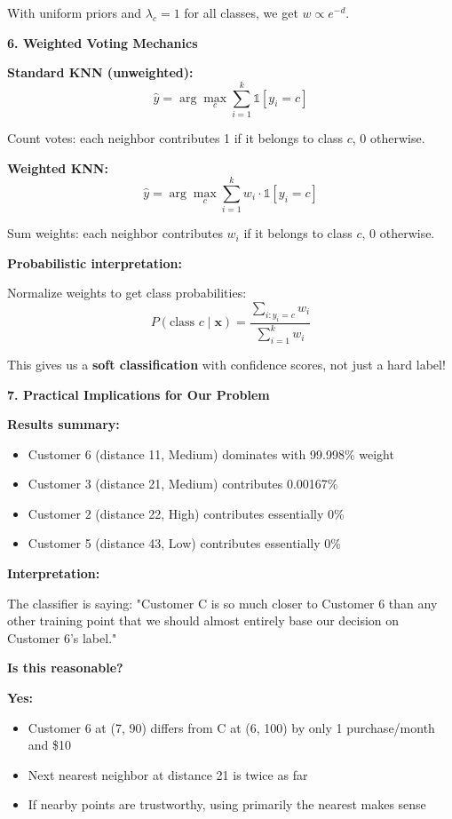\documentclass[12pt]{article}
\begin{document}
\begin{explanation}
With uniform priors and \(\lambda_c = 1\) for all classes, we get \(w \propto e^{-d}\).

\textbf{6. Weighted Voting Mechanics}

\textbf{Standard KNN (unweighted):}
\[
\hat{y} = \arg\max_{c} \sum_{i=1}^k \mathbb{1}[y_i = c]
\]

Count votes: each neighbor contributes 1 if it belongs to class \(c\), 0 otherwise.

\textbf{Weighted KNN:}
\[
\hat{y} = \arg\max_{c} \sum_{i=1}^k w_i \cdot \mathbb{1}[y_i = c]
\]

Sum weights: each neighbor contributes \(w_i\) if it belongs to class \(c\), 0 otherwise.

\textbf{Probabilistic interpretation:}

Normalize weights to get class probabilities:
\[
P(\text{class } c \mid \mathbf{x}) = \frac{\sum_{i: y_i = c} w_i}{\sum_{i=1}^k w_i}
\]

This gives us a \textbf{soft classification} with confidence scores, not just a hard label!

\textbf{7. Practical Implications for Our Problem}

\textbf{Results summary:}
\begin{itemize}
    \item Customer 6 (distance 11, Medium) dominates with 99.998\% weight
    \item Customer 3 (distance 21, Medium) contributes 0.00167\%
    \item Customer 2 (distance 22, High) contributes essentially 0\%
    \item Customer 5 (distance 43, Low) contributes essentially 0\%
\end{itemize}

\textbf{Interpretation:}

The classifier is saying: "Customer C is so much closer to Customer 6 than any other training point that we should almost entirely base our decision on Customer 6's label."

\textbf{Is this reasonable?}

\textbf{Yes:}
\begin{itemize}
    \item Customer 6 at (7, 90) differs from C at (6, 100) by only 1 purchase/month and \$10
    \item Next nearest neighbor at distance 21 is twice as far
    \item If nearby points are trustworthy, using primarily the nearest makes sense
\end{itemize}


\end{explanation}
\end{document}

